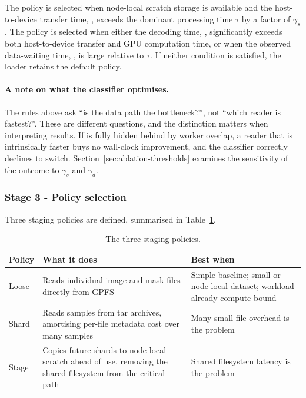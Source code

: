 The  policy is selected when node-local scratch storage is available and the host-to-device transfer time, \Thtod{}, exceeds the dominant processing time $\tau$ by a factor of $\gamma_s$. The  policy is selected when either the decoding time, \Tdecode{}, significantly exceeds both host-to-device transfer and GPU computation time, or when the observed data-waiting time, \Tdata{}, is large relative to $\tau$. If neither condition is satisfied, the loader retains the default  policy.

\paragraph{A note on what the classifier optimises.}
The rules above ask ``is the data path the bottleneck?'', not ``which reader is
fastest?''.
These are different questions, and the distinction matters when interpreting
results.
If \Tdata{} is fully hidden behind \Tgpu{} by worker overlap, a reader that is
intrinsically faster buys no wall-clock improvement, and the classifier correctly
declines to switch.
Section~\ref{sec:ablation-thresholds} examines the sensitivity of the outcome to
$\gamma_s$ and $\gamma_d$.

\subsubsection{Stage 3 - Policy selection}

Three staging policies are defined, summarised in Table~\ref{tab:policies}.

\begin{table}[!ht]
\centering
\begin{tabular}{p{2cm}p{6cm}p{5cm}}
\toprule
Policy & What it does & Best when \\
\midrule
Loose & Reads individual image and mask files directly from GPFS
      & Simple baseline; small or node-local dataset; workload already compute-bound \\
Shard & Reads samples from tar archives, amortising per-file metadata cost over many samples
      & Many-small-file overhead is the problem \\
Stage & Copies future shards to node-local scratch ahead of use, removing the shared filesystem from the critical path
      & Shared filesystem latency is the problem \\
\bottomrule
\end{tabular}
\caption{The three staging policies.}
\label{tab:policies}
\end{table}

